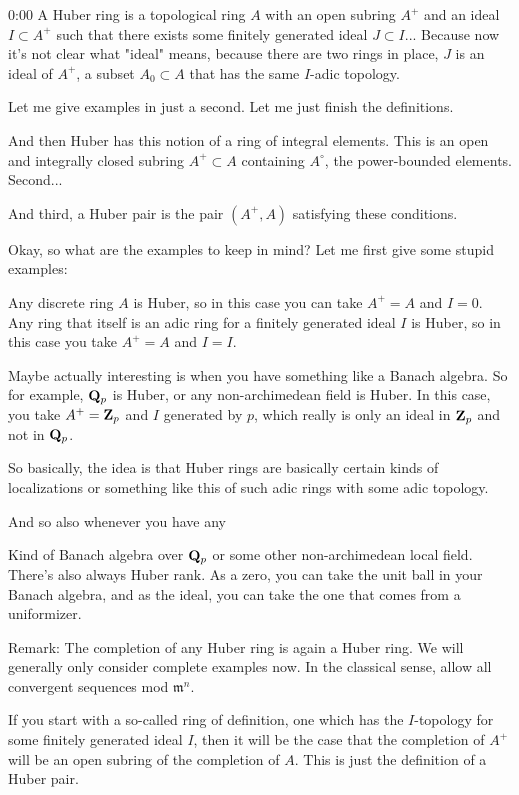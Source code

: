 \begin{unfinished}{0:00}
A Huber ring is a topological ring $A$ with an open subring $A^+$ and an ideal $I \subset A^+$ such that there exists some finitely generated ideal $J \subset I$... Because now it's not clear what "ideal" means, because there are two rings in place, $J$ is an ideal of $A^+$, a subset $A_0 \subset A$ that has the same $I$-adic topology.

Let me give examples in just a second. Let me just finish the definitions.

And then Huber has this notion of a ring of integral elements. This is an open and integrally closed subring $A^+ \subset A$ containing $A^{\circ}$, the power-bounded elements. Second...

And third, a Huber pair is the pair $(A^+, A)$ satisfying these conditions.

Okay, so what are the examples to keep in mind? Let me first give some stupid examples:

Any discrete ring $A$ is Huber, so in this case you can take $A^+ = A$ and $I = 0$. Any ring that itself is an adic ring for a finitely generated ideal $I$ is Huber, so in this case you take $A^+ = A$ and $I = I$.

Maybe actually interesting is when you have something like a Banach algebra. So for example, $\mathbf Q_p$ is Huber, or any non-archimedean field is Huber. In this case, you take $A^+ = \mathbf Z_p$ and $I$ generated by $p$, which really is only an ideal in $\mathbf Z_p$ and not in $\mathbf Q_p$.

So basically, the idea is that Huber rings are basically certain kinds of localizations or something like this of such adic rings with some adic topology.

And so also whenever you have any

Kind of Banach algebra over $\mathbf Q_p$ or some other non-archimedean local field. There's also always Huber rank. As a zero, you can take the unit ball in your Banach algebra, and as the ideal, you can take the one that comes from a uniformizer.

Remark: The completion of any Huber ring is again a Huber ring. We will generally only consider complete examples now. In the classical sense, allow all convergent sequences mod $\mathfrak{m}^n$.

If you start with a so-called ring of definition, one which has the $I$-topology for some finitely generated ideal $I$, then it will be the case that the completion of $A^+$ will be an open subring of the completion of $A$. This is just the definition of a Huber pair.


\end{unfinished}
